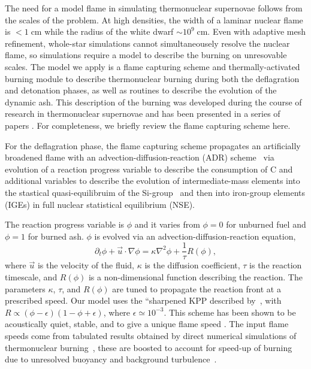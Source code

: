 \documentclass[iop,apj]{emulateapj}
\newcommand{\pv}{\ensuremath{\phi}}
\begin{document}
The need for a model flame in simulating thermonuclear supernovae follows 
from the scales of the problem. At high densities, the width of a laminar 
nuclear flame is $< 1\ensuremath{\;}{\ensuremath{\mathrm{cm}}}$ while the 
radius of the white dwarf $\sim 10^9\ensuremath{\;}{\ensuremath{\mathrm{cm}}}$.
Even with adaptive mesh refinement, whole-star simulations cannot 
simultaneousely resolve the nuclear flame, so simulations require a model to 
describe the burning on unresovable scales.  The model we apply is a flame 
capturing scheme and thermally-activated burning module to describe
thermonuclear burning during both the deflagration and detonation phases, 
as well as routines to describe the evolution of the dynamic ash. 
This description of the burning was developed during the course of research in 
thermonuclear supernovae and has been presented in a series of 
papers \citep[See][and references therein]{chandlery}. For completeness, 
we briefly review the flame capturing scheme here.

For the deflagration phase, the flame capturing scheme propagates an 
artificially broadened flame with an advection-diffusion-reaction (ADR)
scheme~\cite{Khok95,VladWeirRyzh06} via evolution of
a reaction progress variable to describe the consumption of C
and additional variables to describe the evolution of intermediate-mass
elements into the stastical quasi-equilibruim of the 
Si-group~\cite{ifk1981,khok1981,khok1983} and then into iron-group elements
(IGEs) in full nuclear statistical equilibrium (NSE).

The reaction progress variable is $\phi$ and it varies from $\phi=0$ for
unburned fuel and $\phi=1$ for burned ash. $\phi$ is evolved
via an advection-diffusion-reaction equation,
\begin{equation}
  \label{eq:ard}
  \partial_t \pv + \vec{u}\cdot\nabla \pv = \kappa \nabla^2 \pv +
\frac{1}{\tau} R\left(\phi\right) ,
\end{equation}
where $\vec{u}$ is the velocity of the fluid, $\kappa$ is the
diffusion coefficient, $\tau$ is the reaction timescale, and $R(\phi)$ is
a non-dimensional function describing the reaction. The parameters
$\kappa$, $\tau$, and $R(\phi)$ are tuned to propagate the reaction
front at a prescribed speed.  Our model uses the ``sharpened KPP
 described by~\cite{VladWeirRyzh06}, 
with $R\propto(\phi-\epsilon)(1-\phi+\epsilon)$, where
$\epsilon \simeq 10^{-3}$.  This scheme has been shown to be
acoustically quiet, stable, and to give a unique flame speed
\cite{townsley.calder.ea:flame}. The input flame speeds come from
tabulated results obtained by direct numerical simulations of
thermonuclear burning~\cite{timmes92,Chamulak2007The-Laminar-Fla},
these are boosted to account for speed-up of burning due to unresolved 
buoyancy and background turbulence~\cite{Khok95,
gamezo.khokhlov.ea:thermonuclear,townsley.calder.ea:flame,jacketal2014}.
\end{document}
